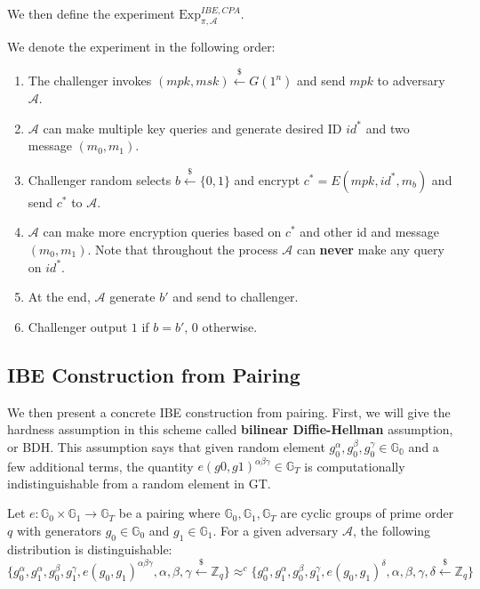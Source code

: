 We then define the experiment $\text{Exp}_{\pi,\mathcal{A}}^{IBE,CPA}$.
\begin{definition}
We denote the experiment in the following order: 
\begin{enumerate}
    \item The challenger invokes $(mpk, msk)\stackrel{\$}{\gets} G(1^n)$ and send $mpk$ to adversary $\mathcal{A}$.
    \item $\mathcal{A}$ can make multiple key queries and generate desired ID $id^{*}$ and two message $(m_0, m_1)$. 
    \item Challenger random selects $b\stackrel{\$}{\gets}\{0,1\}$ and encrypt $c^{*}=E(mpk, id^{*},m_b)$ and send $c^{*}$ to $\mathcal{A}$.
    \item $\mathcal{A}$ can make more encryption queries based on $c^{*}$ and other id and message $(m_0,m_1)$. Note that throughout the process $\mathcal{A}$ can \textbf{never} make any query on $id^{*}$. 
    \item At the end, $\mathcal{A}$ generate $b'$ and send to challenger. 
    \item Challenger output $1$ if $b=b'$, $0$ otherwise. 
\end{enumerate}
\end{definition}

\subsection{IBE Construction from Pairing}
We then present a concrete IBE construction from pairing.
First, we will give the hardness assumption in this scheme called \textbf{bilinear Diffie-Hellman} assumption, or BDH. 
This assumption says that given random element $g_0^{\alpha},g_0^{\beta},g_0^{\gamma}\in\mathbb{G_0}$ and a few additional terms, the quantity $e(g0,g1)^{\alpha\beta\gamma}\in\mathbb{G}_T$ is computationally indistinguishable from a random element in GT.

\begin{definition}
    Let $e: \mathbb{G}_0\times\mathbb{G}_1\rightarrow\mathbb{G}_T$ be a pairing where $\mathbb{G}_0,\mathbb{G}_1,\mathbb{G}_T$ are cyclic groups of prime order $q$ with generators $g_0 \in \mathbb{G}_0$ and $g_1 \in \mathbb{G}_1$. For a given adversary $\mathcal{A}$, the following distribution is distinguishable: 
    \[
    \{g_0^{\alpha},g_1^{\alpha},g_0^{\beta},g_1^{\gamma},e(g_0,g_1)^{\alpha\beta\gamma},  \alpha,\beta,\gamma\stackrel{\$}{\gets}\mathbb{Z}_q\} \approx^{c}
    \{g_0^{\alpha},g_1^{\alpha},g_0^{\beta},g_1^{\gamma},e(g_0,g_1)^{\delta},  \alpha,\beta,\gamma,\delta\stackrel{\$}{\gets}\mathbb{Z}_q\}
    \]
\end{definition}

